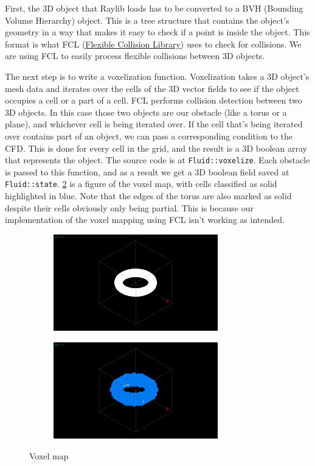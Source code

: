 \documentclass[a4paper,12pt,titlepage]{article}
\begin{document}
First, the 3D object that Raylib loads has to be converted to a BVH (Bounding Volume
Hierarchy) object. This is a tree structure that contains the object's geometry in
a way that makes it easy to check if a point is inside the object. This format
is what FCL (\href{https://github.com/flexible-collision-library/fcl}{Flexible Collision Library})
uses to check for collisions. We are using FCL to easily process flexible
collisions between 3D objects.

The next step is to write a voxelization function. Voxelization takes a 3D
object's mesh data and iterates over the cells of the 3D
vector fields to see if the object occupies a cell or a part of a cell. FCL performs
collision detection between two 3D objects. In this case those two objects are
our obstacle (like a torus or a plane), and whichever cell is being iterated over.
If the cell that's being iterated over contains part of an object, we can pass
a corresponding condition to the CFD. This is done for every cell in the grid,
and the result is a 3D boolean array that represents the object. The source code
is at \lstinline{Fluid::voxelize}. Each obstacle is passed to this function, and
as a result we get a 3D boolean field saved at \lstinline{Fluid::state}.
\ref{fig:voxelmap} is a figure of the voxel map, with cells classified as solid highlighted in
blue. Note that the edges of the torus are also marked as solid despite their cells
obviously only being partial. This is because our implementation of the voxel mapping
using FCL isn't working as intended.

\begin{figure}[H]
    \centering
    \begin{subfigure}[t]{0.45\textwidth}
        \centering
        \includegraphics[height=1.65in]{resources/voxelize1.png}
		\caption{}
    \end{subfigure}
    \hfill
    \begin{subfigure}[t]{0.45\textwidth}
        \centering
        \includegraphics[height=1.65in]{resources/voxelize2.png}
		\caption{}
		\label{fig:voxelmap}
	\end{subfigure} 
    \caption{Voxel map}
\end{figure}
\end{document}
